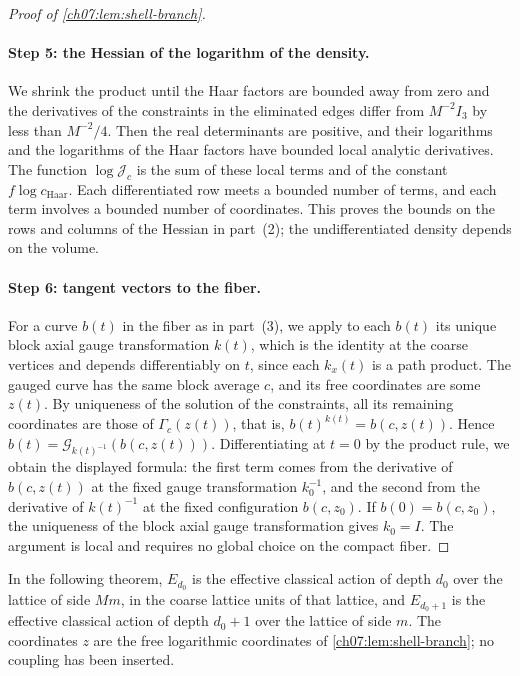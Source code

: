 \begin{proof}[Proof of \cref{ch07:lem:shell-branch}]
\paragraph{Step 5: the Hessian of the logarithm of the density.}
We shrink the product until the Haar factors are bounded away from zero and the derivatives of the constraints in the eliminated edges differ from $M^{-2}I_3$ by less than $M^{-2}/4$. Then the real determinants are positive, and their logarithms and the logarithms of the Haar factors have bounded local analytic derivatives. The function $\log\mathcal J_c$ is the sum of these local terms and of the constant $f\log c_{\mathrm{Haar}}$. Each differentiated row meets a bounded number of terms, and each term involves a bounded number of coordinates. This proves the bounds on the rows and columns of the Hessian in part~(2); the undifferentiated density depends on the volume.

\paragraph{Step 6: tangent vectors to the fiber.}
For a curve $b(t)$ in the fiber as in part~(3), we apply to each $b(t)$ its unique block axial gauge transformation $k(t)$, which is the identity at the coarse vertices and depends differentiably on $t$, since each $k_x(t)$ is a path product. The gauged curve has the same block average $c$, and its free coordinates are some $z(t)$. By uniqueness of the solution of the constraints, all its remaining coordinates are those of $\Gamma_c(z(t))$, that is, $b(t)^{k(t)}=b(c,z(t))$. Hence $b(t)=\mathcal G_{k(t)^{-1}}(b(c,z(t)))$. Differentiating at $t=0$ by the product rule, we obtain the displayed formula: the first term comes from the derivative of $b(c,z(t))$ at the fixed gauge transformation $k_0^{-1}$, and the second from the derivative of $k(t)^{-1}$ at the fixed configuration $b(c,z_0)$. If $b(0)=b(c,z_0)$, the uniqueness of the block axial gauge transformation gives $k_0=I$. The argument is local and requires no global choice on the compact fiber.
\end{proof}

In the following theorem, $E_{d_0}$ is the effective classical action of depth $d_0$ over the lattice of side $Mm$, in the coarse lattice units of that lattice, and $E_{d_0+1}$ is the effective classical action of depth $d_0+1$ over the lattice of side $m$. The coordinates $z$ are the free logarithmic coordinates of \cref{ch07:lem:shell-branch}; no coupling has been inserted.

